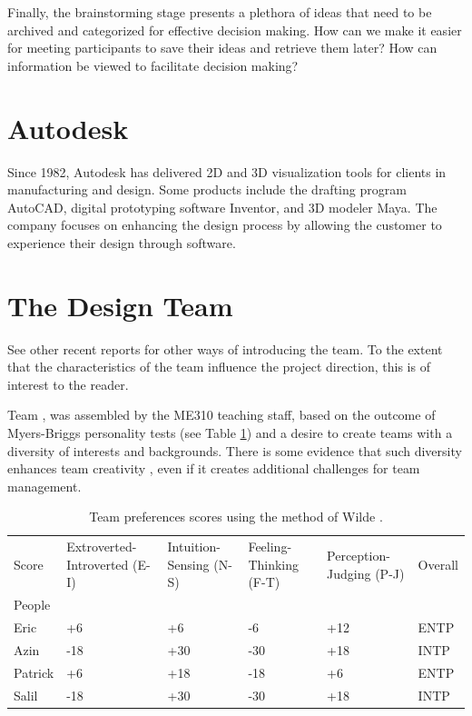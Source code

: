 Finally, the brainstorming stage presents a plethora of ideas that need to be archived and categorized for effective decision making. How can we make it easier for meeting participants to save their ideas and retrieve them later? How can information be viewed to facilitate decision making?

\section{Autodesk}
Since 1982, Autodesk has delivered 2D and 3D visualization tools for clients in manufacturing and design. Some products include the drafting program AutoCAD, digital prototyping software Inventor, and 3D modeler Maya. The company focuses on enhancing the design process by allowing the customer to experience their design through software.


\section{The Design Team}
\label{sec:team}

\begin{remark} \color{blue}
See other recent reports for other ways of introducing the team. To the extent that the characteristics of the team influence the project direction, this is of interest to the reader.
\end{remark} \normalcolor

Team \pmt, was assembled by the ME310 teaching staff, based on the outcome of Myers-Briggs personality tests (see Table \ref{wildeprefs}) and a desire to create teams with a diversity of interests and backgrounds. There is some evidence that such diversity enhances team creativity \cite{Wilde97} \cite{Wilde07}, even if it creates additional challenges for team management.

\begin{table}
  \begin{tabular}{| p{14mm} | p{20mm} | p{20mm} | p{22mm} | p{20mm} | p{12mm} |} 
  \hline
Score & Extroverted-Introverted (E-I) & Intuition-Sensing (N-S) & Feeling-Thinking (F-T) & Perception-Judging (P-J) & Overall \\
People & & & & &\\
\hline
Eric & +6 & +6 & -6 & +12 & ENTP \\
Azin & -18 & +30 & -30 & +18 & INTP \\
Patrick & +6 & +18 & -18 & +6 & ENTP \\
Salil & -18 & +30 & -30 & +18 & INTP \\
\hline
\end{tabular}
\caption{Team preferences scores using the method of Wilde \cite{Wilde07}. }
	\label{wildeprefs}  %
\end{table}

